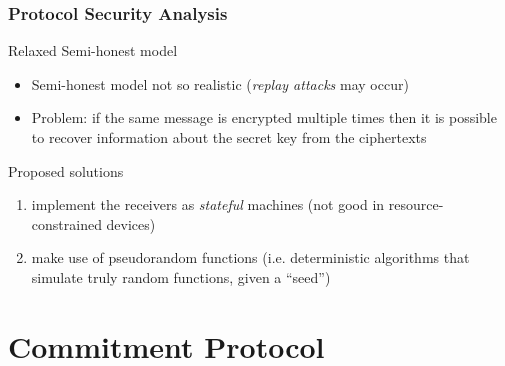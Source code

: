 \begin{frame}
 \frametitle{Protocol Security Analysis }
\begin{block}{Relaxed Semi-honest model}
   \begin{itemize}
    \item Semi-honest model not so realistic (\emph{replay attacks} may occur)
    \item \alert{Problem:} if the same message is encrypted multiple times then it is possible to recover information about the secret key from the ciphertexts\\
   \end{itemize}
  \end{block}

 \begin{block}{Proposed solutions}
    \begin{enumerate}
     \item implement the receivers as \emph{stateful} machines (not good in resource-constrained devices)
     \item make use of pseudorandom functions (i.e. deterministic algorithms that simulate truly random functions, given a ``seed'')
    \end{enumerate}
 \end{block}
 
\end{frame}

\section{Commitment Protocol}


